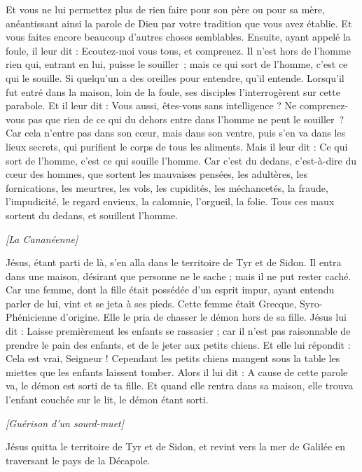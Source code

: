 \begin{multicols}{2}
Et vous ne lui permettez plus de rien faire pour son père ou pour sa mère,
anéantissant ainsi la parole de Dieu par votre tradition que vous avez établie. Et vous faites encore beaucoup d’autres choses semblables.
Ensuite, ayant appelé la foule, il leur dit : Ecoutez-moi vous tous, et comprenez.
Il n’est hors de l’homme rien qui, entrant en lui, puisse le souiller ; mais ce qui sort de l’homme, c’est ce qui le souille.
Si quelqu'un a des oreilles pour entendre, qu'il entende.
Lorsqu’il fut entré dans la maison, loin de la foule, ses disciples l'interrogèrent sur cette parabole.
Et il leur dit : Vous aussi, êtes-vous sans intelligence ? Ne comprenez-vous pas que rien de ce qui du dehors entre dans l’homme ne peut le souiller ?
Car cela n'entre pas dans son cœur, mais dans son ventre, puis s’en va dans les lieux secrets, qui purifient le corps de tous les aliments.
Mais il leur dit : Ce qui sort de l'homme, c'est ce qui souille l'homme.
Car c’est du dedans, c'est-à-dire du cœur des hommes, que sortent les mauvaises pensées, les adultères, les fornications, les meurtres,
les vols, les cupidités, les méchancetés, la fraude, l'impudicité, le regard envieux, la calomnie, l’orgueil, la folie.
Tous ces maux sortent du dedans, et souillent l'homme.
\begin{center}
\textit{[La Cananéenne]}
\end{center}
\PPE{}
Jésus, étant parti de là, s'en alla dans le territoire de Tyr et de Sidon. Il entra dans une maison, désirant que personne ne le sache ; mais il ne put rester caché.
Car une femme, dont la fille était possédée d'un esprit impur, ayant entendu parler de lui, vint et se jeta à ses pieds.
Cette femme était Grecque, Syro-Phénicienne d’origine. Elle le pria de chasser le démon hors de sa fille. Jésus lui dit :
Laisse premièrement les enfants se rassasier ; car il n'est pas raisonnable de prendre le pain des enfants, et de le jeter aux petits chiens.
Et elle lui répondit : Cela est vrai, Seigneur ! Cependant les petits chiens mangent sous la table les miettes que les enfants laissent tomber.
Alors il lui dit : A cause de cette parole va, le démon est sorti de ta fille.
Et quand elle rentra dans sa maison, elle trouva l’enfant couchée sur le lit, le démon étant sorti.
\begin{center}
\textit{[Guérison d'un sourd-muet]}
\end{center}
\PPE{}
Jésus quitta le territoire de Tyr et de Sidon, et revint vers la mer de Galilée en traversant le pays de la Décapole.

\end{multicols}
